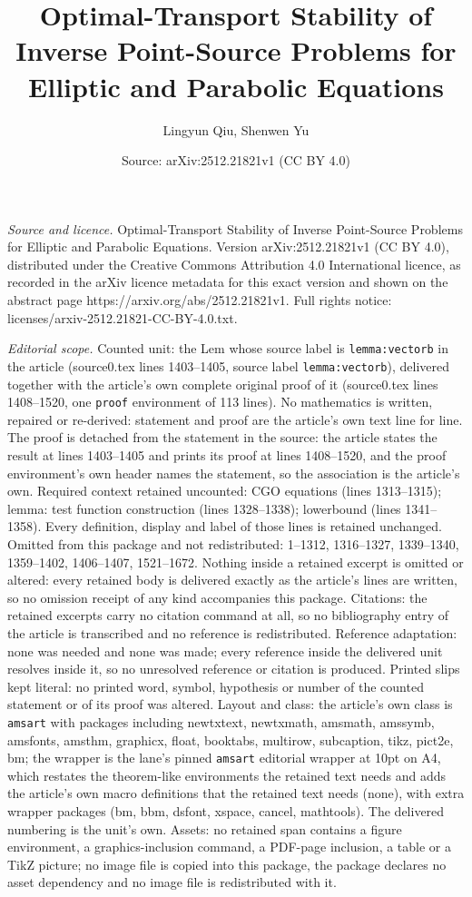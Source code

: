 \documentclass[10pt,a4paper]{amsart}
\title[Optimal-Transport Stability of Inverse Point-Source Problems]{Optimal-Transport Stability of Inverse Point-Source Problems for Elliptic and Parabolic Equations}
\author{Lingyun Qiu, Shenwen Yu}
\date{Source: arXiv:2512.21821v1 (CC BY 4.0)}
\begin{document}
\maketitle

\noindent\emph{Source and licence.} Optimal-Transport Stability of Inverse Point-Source Problems for Elliptic and Parabolic Equations. Version arXiv:2512.21821v1 (CC BY 4.0), distributed under the Creative Commons Attribution 4.0 International licence, as recorded in the arXiv licence metadata for this exact version and shown on the abstract page https://arxiv.org/abs/2512.21821v1. Full rights notice: licenses/arxiv-2512.21821-CC-BY-4.0.txt.\par\smallskip

\noindent\textit{Editorial scope.} Counted unit: the Lem whose source label is \texttt{lemma:vectorb} in the article (source0.tex lines 1403--1405, source label \texttt{lemma:vectorb}), delivered together with the article's own complete original proof of it (source0.tex lines 1408--1520, one \texttt{proof} environment of 113 lines). No mathematics is written, repaired or re-derived: statement and proof are the article's own text line for line. The proof is detached from the statement in the source: the article states the result at lines 1403--1405 and prints its proof at lines 1408--1520, and the proof environment's own header names the statement, so the association is the article's own. Required context retained uncounted: CGO equations (lines 1313--1315); lemma: test function construction (lines 1328--1338); lowerbound (lines 1341--1358). Every definition, display and label of those lines is retained unchanged. Omitted from this package and not redistributed: 1--1312, 1316--1327, 1339--1340, 1359--1402, 1406--1407, 1521--1672. Nothing inside a retained excerpt is omitted or altered: every retained body is delivered exactly as the article's lines are written, so no omission receipt of any kind accompanies this package. Citations: the retained excerpts carry no citation command at all, so no bibliography entry of the article is transcribed and no reference is redistributed. Reference adaptation: none was needed and none was made; every reference inside the delivered unit resolves inside it, so no unresolved reference or citation is produced. Printed slips kept literal: no printed word, symbol, hypothesis or number of the counted statement or of its proof was altered. Layout and class: the article's own class is \texttt{amsart} with packages including newtxtext, newtxmath, amsmath, amssymb, amsfonts, amsthm, graphicx, float, booktabs, multirow, subcaption, tikz, pict2e, bm; the wrapper is the lane's pinned \texttt{amsart} editorial wrapper at 10pt on A4, which restates the theorem-like environments the retained text needs and adds the article's own macro definitions that the retained text needs (none), with extra wrapper packages (bm, bbm, dsfont, xspace, cancel, mathtools). The delivered numbering is the unit's own. Assets: no retained span contains a figure environment, a graphics-inclusion command, a PDF-page inclusion, a table or a TikZ picture; no image file is copied into this package, the package declares no asset dependency and no image file is redistributed with it. 
\end{document}

